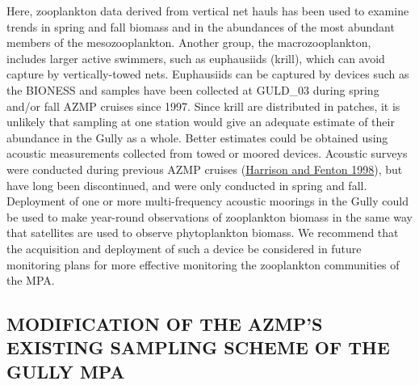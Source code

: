 \documentclass[12pt]{article}\usepackage[]{graphicx}\usepackage[]{color}
\begin{document}
Here, zooplankton data derived from vertical net hauls has been used to examine trends in spring and fall biomass and in the abundances of the most abundant members of the mesozooplankton. Another group, the macrozooplankton, includes larger active swimmers, such as euphausiids (krill), which can avoid capture by vertically-towed nets. Euphausiids can be captured by devices such as the BIONESS and samples have been collected at GULD\_03 during spring and/or fall AZMP cruises since 1997. Since krill are distributed in patches, it is unlikely that sampling at one station would give an adequate estimate of their abundance in the Gully as a whole. Better estimates could be obtained using acoustic measurements collected from towed or moored devices. Acoustic surveys were conducted during previous AZMP cruises (\protect\hyperlink{ref-harrison_1998}{Harrison and Fenton 1998}), but have long been discontinued, and were only conducted in spring and fall. Deployment of one or more multi-frequency acoustic moorings in the Gully could be used to make year-round observations of zooplankton biomass in the same way that satellites are used to observe phytoplankton biomass. We recommend that the acquisition and deployment of such a device be considered in future monitoring plans for more effective monitoring the zooplankton communities of the MPA.

\hypertarget{modification-of-the-azmps-existing-sampling-scheme-of-the-gully-mpa}{%
\subsection{\texorpdfstring{\textbf{MODIFICATION OF THE AZMP'S EXISTING SAMPLING SCHEME OF THE GULLY MPA}}{MODIFICATION OF THE AZMP'S EXISTING SAMPLING SCHEME OF THE GULLY MPA}}\label{modification-of-the-azmps-existing-sampling-scheme-of-the-gully-mpa}}
\end{document}

